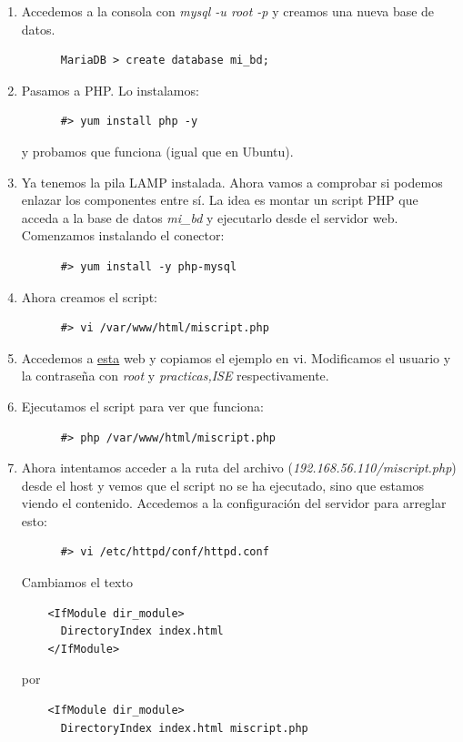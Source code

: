 \documentclass[12pt,spanish]{article}
\begin{document}
\begin{enumerate}
    \item Accedemos a la consola con \textit{mysql -u root -p} y creamos una nueva base de datos.
    \begin{lstlisting}
      MariaDB > create database mi_bd;
    \end{lstlisting}
    \item Pasamos a PHP. Lo instalamos:
    \begin{lstlisting}
      #> yum install php -y
    \end{lstlisting}
    y probamos que funciona (igual que en Ubuntu).
    \item Ya tenemos la pila LAMP instalada. Ahora vamos a comprobar si podemos enlazar los componentes entre sí. La idea es montar un script PHP que acceda a la base de datos \textit{mi\_bd} y ejecutarlo desde el servidor web. Comenzamos instalando el conector:
    \begin{lstlisting}
      #> yum install -y php-mysql
    \end{lstlisting}
    \item Ahora creamos el script:
    \begin{lstlisting}
      #> vi /var/www/html/miscript.php
    \end{lstlisting}
    \item Accedemos a \href{https://www.php.net/manual/es/function.mysqli-connect.php}{esta} web y copiamos el ejemplo en vi. Modificamos el usuario y la contraseña con \textit{root} y \textit{practicas,ISE} respectivamente.
    \item Ejecutamos el script para ver que funciona:
    \begin{lstlisting}
      #> php /var/www/html/miscript.php
    \end{lstlisting}
    \item Ahora intentamos acceder a la ruta del archivo (\textit{192.168.56.110/miscript.php}) desde el host y vemos que el script no se ha ejecutado, sino que estamos viendo el contenido. Accedemos a la configuración del servidor para arreglar esto:
    \begin{lstlisting}
      #> vi /etc/httpd/conf/httpd.conf
    \end{lstlisting}
    Cambiamos el texto
    \begin{lstlisting}
    <IfModule dir_module>
      DirectoryIndex index.html
    </IfModule>
    \end{lstlisting}
    por
    \begin{lstlisting}
    <IfModule dir_module>
      DirectoryIndex index.html miscript.php

\end{lstlisting}
\end{enumerate}
\end{document}

